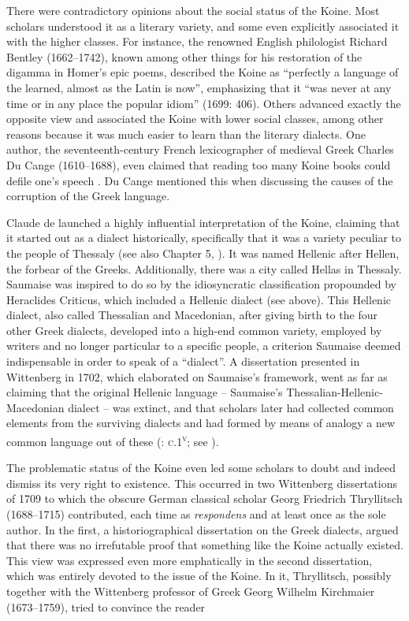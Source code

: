 {There were contradictory opinions about the social status of the Koine. Most scholars understood it as a literary variety, and some even explicitly associated it with the higher classes. For instance, the renowned English philologist Richard Bentley (1662–1742), known among other things for his restoration of the digamma in Homer’s epic poems, described the Koine as “perfectly a language of the learned, almost as the Latin is now”, emphasizing that it “was never at any time or in any place the popular idiom” (1699: 406). Others advanced exactly the opposite view and associated the Koine with lower social classes, among other reasons because it was much easier to learn than the literary dialects. One author, the seventeenth-century French lexicographer of medieval Greek Charles Du Cange (1610–1688), even claimed that reading too many Koine books could defile one’s speech \citep[iv]{Du1688}. Du Cange mentioned this when discussing the causes of the corruption of the Greek language.

Claude de \citet[esp. 405--406]{Saumaise1643a} launched a highly influential interpretation of the Koine, claiming that it started out as a dialect historically, specifically that it was a variety peculiar to the people of Thessaly (see also Chapter 5, ). It was named Hellenic after Hellen, the forbear of the Greeks. Additionally, there was a city called Hellas in Thessaly. Saumaise was inspired to do so by the idiosyncratic classification propounded by Heraclides Criticus, which included a Hellenic dialect (see  above). This Hellenic dialect, also called Thessalian and Macedonian, after giving birth to the four other Greek dialects, developed into a high-end common variety, employed by writers and no longer particular to a specific people, a criterion Saumaise deemed indispensable in order to speak of a “dialect”. A dissertation presented in Wittenberg in 1702, which elaborated on Saumaise’s framework, went as far as claiming that the original Hellenic language – Saumaise’s Thessalian-Hellenic-Macedonian dialect – was extinct, and that scholars later had collected common elements from the surviving dialects and had formed by means of analogy a new common language out of these (\citealt{Schwartz1702}: \textsc{c}.1\textsc{\textsuperscript{v}}; see \citet[]{VanRooyFce}).

The problematic status of the Koine even led some scholars to doubt and indeed dismiss its very right to existence. This occurred in two Wittenberg dissertations of 1709 to which the obscure German classical scholar Georg Friedrich Thryllitsch (1688–1715) contributed, each time as \textit{respondens} and at least once as the sole author. In the first, a historiographical dissertation on the Greek dialects, \citet[\textsc{d.1}\textsc{\textsuperscript{v}}]{Thryllitsch1709} argued that there was no irrefutable proof that something like the Koine actually existed. This view was expressed even more emphatically in the second dissertation, which was entirely devoted to the issue of the Koine. In it, Thryllitsch, possibly together with the Wittenberg professor of Greek Georg Wilhelm Kirchmaier (1673–1759), tried to convince the reader

}
